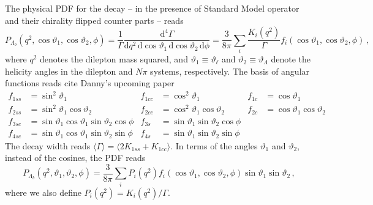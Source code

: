 \documentclass[aps,prd,reprint,nofootinbib,preprintnumbers]{revtex4}
\newcommand{\dd}{\text{d}}
\renewcommand{\theta}{\vartheta}
\newcommand{\fred}[1]{{\color{brown!85!black}#1}}
\begin{document}
The physical PDF for the decay -- in the presence of Standard Model operator and their chirality flipped counter parts -- reads \cite{Boeer:2014xx}
\begin{equation}
    P_{\Lambda_b}(q^2, \cos\theta_1, \cos\theta_2, \phi) = \frac{1}{\Gamma} \frac{\dd^4\Gamma}{\dd q^2\,\dd \cos\theta_1\,\dd \cos\theta_2\,\dd \phi} = \frac{3}{8\pi} \sum_i \frac{K_{i}(q^2)}{\Gamma} f_i(\cos\theta_1, \cos\theta_2, \phi)\,,
\end{equation}
where $q^2$ denotes the dilepton mass squared, and $\theta_1 \equiv \theta_\ell$ and $\theta_2 \equiv \theta_\Lambda$ denote the
helicity angles in the dilepton and $N\pi$ systems, respectively. The basis of angular functions reads \fred{cite Danny's upcoming paper}
\begin{equation}
    \begin{aligned}
        f_{1ss} & = \sin^2\theta_1 &
        f_{1cc} & = \cos^2\theta_1 &
        f_{1c}  & = \cos\theta_1\\
        f_{2ss} & = \sin^2\theta_1 \cos\theta_2 &
        f_{2cc} & = \cos^2\theta_1 \cos\theta_2 &
        f_{2c}  & = \cos\theta_1   \cos\theta_2 \\
        f_{3sc} & = \sin\theta_1 \cos\theta_1 \sin\theta_2 \cos\phi &
        f_{3s}  & = \sin\theta_1              \sin\theta_2 \cos\phi \\
        f_{4sc} & = \sin\theta_1 \cos\theta_1 \sin\theta_2 \sin\phi &
        f_{4s}  & = \sin\theta_1              \sin\theta_2 \sin\phi
    \end{aligned}
\end{equation}
The decay width reads $\langle\Gamma\rangle = \langle2 K_{1ss} + K_{1cc}\rangle$. In terms of the angles $\theta_1$ and $\theta_2$, instead of the cosines, the PDF reads
\begin{equation}
    P_{\Lambda_b}(q^2, \theta_1, \theta_2, \phi) = \frac{3}{8\pi} \sum_i P_i(q^2) f_i(\cos\theta_1, \cos\theta_2, \phi) \sin\theta_1 \sin\theta_2\,,
\end{equation}
where we also define $P_i(q^2) = K_i(q^2) / \Gamma$.
\end{document}

